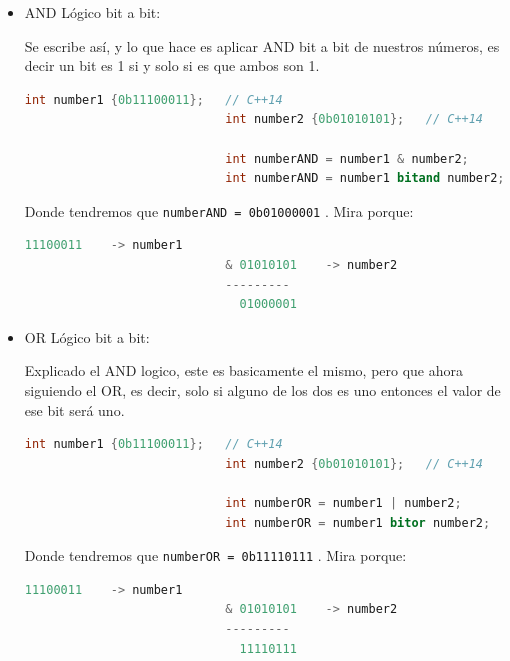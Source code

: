 \documentclass[12pt, fleqn]{report}                             %
\theoremstyle{break}                                            %
\newcommand{\textCode}[1]  { \texttt{#1} }                      %
\begin{document}
                \begin{itemize}
                    \item AND Lógico bit a bit: 
                    
                        Se escribe así, y lo que hace es aplicar AND bit a bit de nuestros números, es decir
                        un bit es 1 si y solo si es que ambos son 1.
                        \begin{lstlisting}[language=C++, gobble=28]
                            int number1 {0b11100011};   // C++14
                            int number2 {0b01010101};   // C++14

                            int numberAND = number1 & number2;
                            int numberAND = number1 bitand number2;
                        \end{lstlisting}

                        Donde tendremos que \textCode{numberAND = 0b01000001}. Mira porque:
                        \begin{lstlisting}[language=C++, gobble=28]
                              11100011    -> number1
                            & 01010101    -> number2
                            ---------
                              01000001
                        \end{lstlisting}
                        
                    \item OR Lógico bit a bit: 
                    
                        Explicado el AND logico, este es basicamente el mismo, pero que ahora siguiendo el OR, es
                        decir, solo si alguno de los dos es uno entonces el valor de ese bit será uno.
                        \begin{lstlisting}[language=C++, gobble=28]
                            int number1 {0b11100011};   // C++14
                            int number2 {0b01010101};   // C++14

                            int numberOR = number1 | number2;
                            int numberOR = number1 bitor number2;
                        \end{lstlisting}

                        Donde tendremos que \textCode{numberOR = 0b11110111}. Mira porque:
                        \begin{lstlisting}[language=C++, gobble=28]
                              11100011    -> number1
                            & 01010101    -> number2
                            ---------
                              11110111
                        \end{lstlisting}
                    

\end{itemize}
\end{document}
